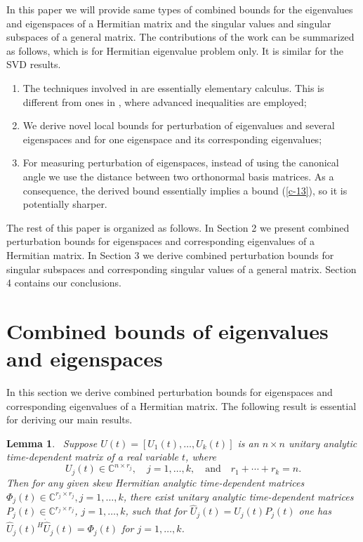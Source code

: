 \documentclass[11pt,a4paper]{article}
\numberwithin{equation}{section}
\newtheorem{Lemma}{Lemma}[section]
\newcommand {\wh} {\widehat}
\begin{document}
In this paper we will provide same types of combined bounds for the eigenvalues and
eigenspaces of a Hermitian matrix and the singular values and singular subspaces of
a general matrix.  The contributions of the work  can be summarized as follows, which
is for Hermitian eigenvalue problem only. It is similar for the SVD results.
\begin{enumerate}
\item[(a)] The techniques involved in \cite{bunbmn91,de99, kat80}  are essentially elementary calculus. This is different from ones in \cite{li07}, where advanced inequalities are employed;
\item[(b)] We derive novel local bounds for perturbation of eigenvalues and several eigenspaces and for one eigenspace and its corresponding eigenvalues;

\item[(c)] For measuring  perturbation of eigenspaces, instead of using the canonical angle we use the distance between two orthonormal basis matrices. As a consequence, the derived bound essentially implies a bound (\ref{c-13}), so it is potentially sharper.
\end{enumerate}\vskip 2mm

The rest of this paper is organized as follows. In Section 2 we present combined perturbation bounds for eigenspaces and corresponding eigenvalues of a Hermitian  matrix.
In Section 3 we derive combined perturbation bounds for singular subspaces and corresponding singular values of a general matrix. Section 4 contains our conclusions.

\section{Combined bounds of eigenvalues and eigenspaces}
%
In this section we derive combined perturbation bounds for eigenspaces and corresponding eigenvalues of a Hermitian matrix. The following result is essential for deriving our main results.\vskip 2mm

\begin{Lemma}~\label{lem21}
Suppose $U(t)=[U_1(t), \ldots, U_k(t)]$ is an $n\times n$ unitary analytic time-dependent matrix of a real variable $t$, where
 $$ U_j(t)\in\mathbb{C}^{n\times r_j},\quad j=1,\ldots,k,\quad\mbox{and} \quad r_1+\cdots+r_k=n.$$
 Then for any given skew Hermitian analytic time-dependent matrices $\Phi_j(t)\in\mathbb{C}^{r_j\times r_j}, j=1,\ldots,k$, there exist unitary analytic time-dependent matrices $P_j(t)\in\mathbb{C}^{r_j\times r_j}$,
$j=1,\ldots,k$, such that for $\wh U_j(t)=U_j(t)P_j(t)$ one has $\wh U_j(t)^H \dot {\wh U}_j(t)=\Phi_j(t)$ for $j=1,\ldots,k$.
\end{Lemma}\vskip 2mm
\end{document}
